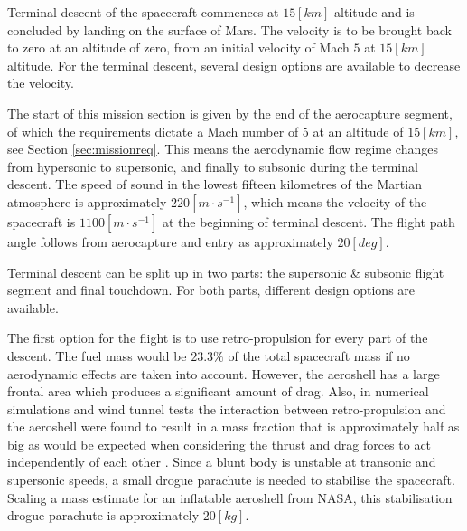 Terminal descent of the spacecraft commences at $15 [km]$ altitude and is concluded by landing on the surface of Mars. The velocity is to be brought back to zero at an altitude of zero, from an initial velocity of Mach $5$ at $15 [km]$ altitude. For the terminal descent, several design options are available to decrease the velocity.%

The start of this mission section is given by the end of the aerocapture segment, of which the requirements dictate a Mach number of 5 at an altitude of $15 \left[km\right]$, see Section \ref{sec:missionreq}. This means the aerodynamic flow regime changes from hypersonic to supersonic, and finally to subsonic during the terminal descent. The speed of sound in the lowest fifteen kilometres of the Martian atmosphere is approximately $220 \left[m\cdot s^{-1}\right]$, which means the velocity of the spacecraft is $1100 \left[m\cdot s^{-1}\right]$ at the beginning of terminal descent. The flight path angle follows from aerocapture and entry as approximately $20 \left[deg\right]$.%

Terminal descent can be split up in two parts: the supersonic \& subsonic flight segment and final touchdown. For both parts, different design options are available.

The first option for the flight is to use retro-propulsion for every part of the descent. The fuel mass would be $23.3\%$ of the total spacecraft mass if no aerodynamic effects are taken into account. However, the aeroshell has a large frontal area which produces a significant amount of drag. Also, in numerical simulations and wind tunnel tests the interaction between retro-propulsion and the aeroshell were found to result in a mass fraction that is approximately half as big as would be expected when considering the thrust and drag forces to act independently of each other \cite{Korzun2009}. Since a blunt body is unstable at transonic and supersonic speeds, a small drogue parachute is needed to stabilise the spacecraft. Scaling a mass estimate for an inflatable aeroshell from NASA, this stabilisation drogue parachute is approximately $20 [kg]$.

